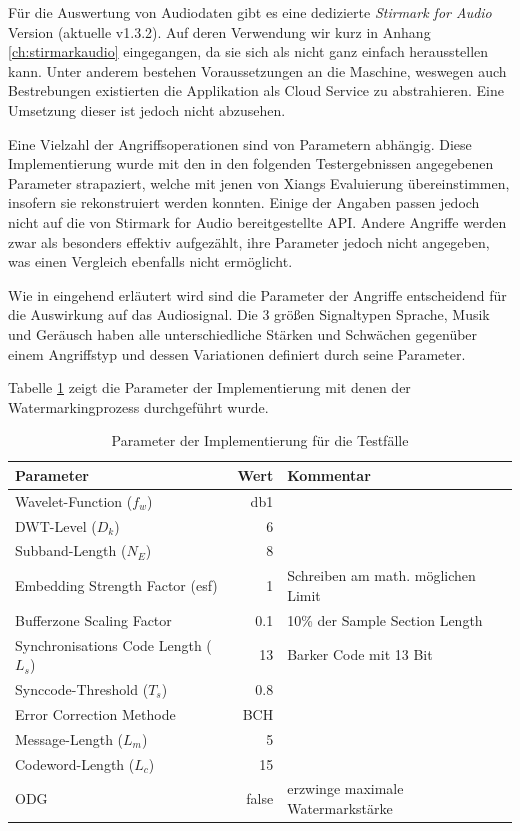 Für die Auswertung von Audiodaten gibt es eine dedizierte \textit{Stirmark for Audio} Version\cite{stirmarkforaudio} (aktuelle v1.3.2). Auf deren Verwendung wir kurz in Anhang \ref{ch:stirmarkaudio} eingegangen, da sie sich als nicht ganz einfach herausstellen kann. Unter anderem bestehen Voraussetzungen an die Maschine, weswegen auch Bestrebungen existierten die Applikation als Cloud Service zu abstrahieren\cite{petitcolas2001public}. Eine Umsetzung dieser ist jedoch nicht abzusehen. 

Eine Vielzahl der Angriffsoperationen sind von Parametern abhängig. Diese Implementierung wurde mit den in den folgenden Testergebnissen angegebenen Parameter strapaziert, welche mit jenen von Xiangs Evaluierung\cite{xiang2007robust} übereinstimmen, insofern sie rekonstruiert werden konnten. Einige der Angaben passen jedoch nicht auf die von Stirmark for Audio bereitgestellte API. Andere Angriffe werden zwar als besonders effektiv aufgezählt, ihre Parameter jedoch nicht angegeben, was einen Vergleich ebenfalls nicht ermöglicht. 

Wie in \cite{lang2004stirmark} eingehend erläutert wird sind die Parameter der Angriffe entscheidend für die Auswirkung auf das Audiosignal. Die 3 größen Signaltypen Sprache, Musik und Geräusch haben alle unterschiedliche Stärken und Schwächen gegenüber einem Angriffstyp und dessen Variationen definiert durch seine Parameter. 

Tabelle \ref{tab:algo_settings} zeigt die Parameter der Implementierung mit denen der Watermarkingprozess durchgeführt wurde. 

\begin{table}[h]
\begin{tabular}{lrl}
\hline
\textbf{Parameter} 	 & \textbf{Wert} & \textbf{Kommentar} 	 \\ \hline
Wavelet-Function (${f}_{w}$)             & db1           & 	 \\
DWT-Level (${D}_{k}$) 	 & 6             & 	 \\
Subband-Length (${N}_{E}$)               & 8             & 	 \\
Embedding Strength Factor (esf)          & 1             & Schreiben am math. möglichen Limit       \\
Bufferzone Scaling Factor                & 0.1           & 10\% der Sample Section Length           \\
Synchronisations Code Length (${L}_{s}$) & 13            & Barker Code mit 13 Bit 	\\
Synccode-Threshold (${T}_{s}$)           & 0.8           & 	 \\
Error Correction Methode                 & BCH           & 	 \\
Message-Length (${L}_{m}$)               & 5             & 	 \\
Codeword-Length (${L}_{c}$)              & 15            & 	 \\
ODG 			 & false         & erzwinge maximale Watermarkstärke  		\\ \hline
 	 	
\end{tabular} 	
\caption{Parameter der Implementierung für die Testfälle}
\label{tab:algo_settings}
\end{table}	

